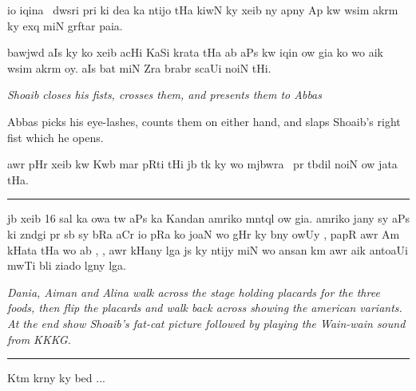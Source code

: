 \documentclass[a4paper]{article}
\newcommand{\instr}[1]{\vm\hfill\en{\itshape #1}}
\begin{document}
	io iqina~ dwsri pri ki dea ka ntijo tHa kiwN ky xeib ny apny Ap kw wsim akrm ky exq miN grftar paia.

	bawjwd aIs ky ko xeib acHi KaSi  krata tHa ab aPs kw iqin ow gia ko wo aik  wsim akrm oy.
	aIs bat miN Zra brabr scaUi noiN tHi.


\begin{enpara}
	\itshape
	Shoaib closes his fists, crosses them, and presents them to Abbas

	Abbas picks his eye-lashes, counts them on either hand, and slaps Shoaib's right fist which he opens.
\end{enpara}

	\vspace{0\baselineskip}
	\begin{itemize}
	\end{itemize}

	awr pHr xeib kw Kwb mar pRti tHi jb tk ky wo mjbwra~  pr tbdil noiN ow jata tHa.

\vm
\rule{\textwidth}{1pt}
\vm\vm

	jb xeib 16 sal ka owa tw aPs ka Kandan amriko mntql ow gia.
	amriko jany sy aPs ki zndgi pr sb sy bRa aCr io pRa ko joaN wo gHr ky bny owUy , papR awr Am kHata tHa wo ab , , awr  kHany lga js ky ntijy miN wo ansan km awr aik antoaUi mwTi bli ziado lgny lga.

\begin{enpara}
	\itshape
	Dania, Aiman and Alina walk across the stage holding placards for the three foods, then flip the placards and walk back across showing the american variants. At the end show Shoaib's fat-cat picture followed by playing the Wain-wain sound from KKKG.
\end{enpara}

\rule{\textwidth}{1pt}
\vm\vm\vm

	 Ktm krny ky bed ...

\instr{Show high-school photo}
\end{document}

